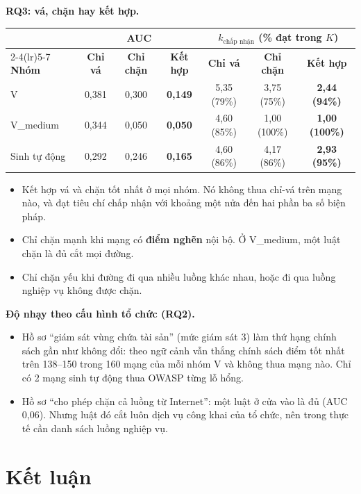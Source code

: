 \documentclass[11pt,a4paper]{article}
\begin{document}
\textbf{RQ3: vá, chặn hay kết hợp.}
\begin{center}
\footnotesize
\begin{tabular}{@{}l ccc ccc@{}}
\toprule
& \multicolumn{3}{c}{\textbf{AUC}} & \multicolumn{3}{c}{\textbf{$k_{\text{chấp nhận}}$ (\% đạt trong $K$)}} \\
\cmidrule(lr){2-4}\cmidrule(lr){5-7}
\textbf{Nhóm} & \textbf{Chỉ vá} & \textbf{Chỉ chặn} & \textbf{Kết hợp} & \textbf{Chỉ vá} & \textbf{Chỉ chặn} & \textbf{Kết hợp} \\
\midrule
V & 0,381 & 0,300 & \textbf{0,149} & 5,35 (79\%) & 3,75 (75\%) & \textbf{2,44 (94\%)} \\
V\_medium & 0,344 & 0,050 & \textbf{0,050} & 4,60 (85\%) & 1,00 (100\%) & \textbf{1,00 (100\%)} \\
Sinh tự động & 0,292 & 0,246 & \textbf{0,165} & 4,60 (86\%) & 4,17 (86\%) & \textbf{2,93 (95\%)} \\
\bottomrule
\end{tabular}
\end{center}
\begin{itemize}
  \item Kết hợp vá và chặn tốt nhất ở mọi nhóm. Nó không thua chỉ-vá trên mạng nào, và đạt tiêu chí chấp nhận với khoảng một nửa đến hai phần ba số biện pháp.
  \item Chỉ chặn mạnh khi mạng có \textbf{điểm nghẽn} nội bộ. Ở V\_medium, một luật chặn là đủ cắt mọi đường.
  \item Chỉ chặn yếu khi đường đi qua nhiều luồng khác nhau, hoặc đi qua luồng nghiệp vụ không được chặn.
\end{itemize}

\textbf{Độ nhạy theo cấu hình tổ chức (RQ2).}
\begin{itemize}
  \item Hồ sơ ``giám sát vùng chứa tài sản'' (mức giám sát 3) làm thứ hạng chính sách gần như không đổi: theo ngữ cảnh vẫn thắng chính sách điểm tốt nhất trên 138--150 trong 160 mạng của mỗi nhóm V và không thua mạng nào. Chỉ có 2 mạng sinh tự động thua OWASP từng lỗ hổng.
  \item Hồ sơ ``cho phép chặn cả luồng từ Internet'': một luật ở cửa vào là đủ (AUC 0,06). Nhưng luật đó cắt luôn dịch vụ công khai của tổ chức, nên trong thực tế cần danh sách luồng nghiệp vụ.
\end{itemize}

\section{Kết luận}
\end{document}
